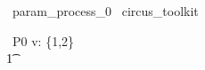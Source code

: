 
\begin{zsection}
  \SECTION\ param\_process\_0 \parents\ circus\_toolkit
\end{zsection}

\begin{circus}
    \circprocess\ P0 \circdef  v: \{1,2\} \circspot \circbegin  \\
        \t1 \circspot \Skip \\
    \circend
\end{circus}

